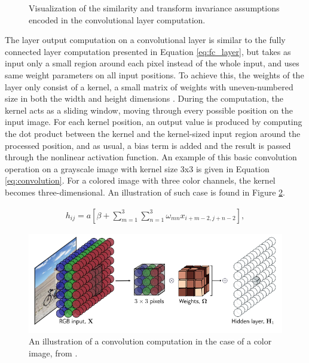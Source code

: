 \documentclass{article}
\begin{document}
\begin{figure}[h]
    \caption{Visualization of the similarity and transform invariance assumptions encoded in the convolutional layer computation.}
    \label{fig:conv_assumptions}
\end{figure}

The layer output computation on a convolutional layer is similar to the fully connected layer computation
presented in Equation \ref{eq:fc_layer}, but takes as input only a small region around each pixel instead of 
the whole input, and uses same weight parameters on all input positions. To achieve this, the weights of the 
layer only consist of a kernel, a small 
matrix of weights with uneven-numbered size in both the width and height dimensions \cite{princebook}. During the computation, the kernel 
acts as a sliding window, moving through every possible position on the input image. For each kernel position, an output 
value is produced by computing the dot product between the kernel and the kernel-sized input region around the processed position, and as usual, a bias term is added and the result is passed through the nonlinear activation function.
An example of this basic convolution operation on a grayscale image with kernel size 3x3 is given in Equation \ref{eq:convolution}. 
For a colored image with three color channels, the kernel becomes three-dimensional. An illustration 
of such case is found in Figure \ref{image:3dkernel}.

\begin{align}
    h_{ij} = a \left[ \beta + \sum_{m=1}^{3} \sum_{n=1}^{3} \omega_{mn} x_{i+m-2, j+n-2} \right],
    \label{eq:convolution}
\end{align}

\begin{figure}[h]
    \centering
    \includegraphics*[scale=0.4]{../images/3dkernel.png}
    \caption{An illustration of a convolution computation in the case of a color image, from \cite{princebook}.}
    \label{image:3dkernel}
\end{figure}
\end{document}
